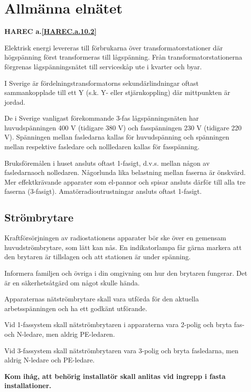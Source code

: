 \section{Allmänna elnätet}
\textbf{
HAREC a.\ref{HAREC.a.10.2}\label{myHAREC.a.10.2}
}
\label{jordning}

Elektrisk energi levereras till förbrukarna över
transformatorstationer där högspänning först transformeras till
lågspänning. Från transformatorstationerna förgrenas lågspänningsnätet
till serviceskåp ute i kvarter och byar.

I Sverige är fördelningstransformatorns sekundärlindningar oftast
sammankopplade till ett Y (s.k. Y- eller stjärnkoppling) där
mittpunkten är jordad.

De i Sverige vanligast förekommande 3-fas lågspänningsnäten har
huvudspänningen 400 V (tidigare 380 V) och fasspänningen 230 V
(tidigare 220 V). Spänningen mellan fasledarna kallas för
huvudspänning och spänningen mellan respektive fasledare och
nollledaren kallas för fasspänning.

Bruksföremålen i huset ansluts oftast 1-fasigt, d.v.s. mellan någon av
fasledarnaoch nolledaren. Någorlunda lika belastning mellan faserna är
önskvärd.  Mer effektkrävande apparater som el-pannor och spisar
ansluts därför till alla tre faserna (3-fasigt).
Amatörradioutrustningar ansluts oftast 1-fasigt.

\subsection{Strömbrytare}

Kraftförsörjningen av radiostationens apparater bör ske över en
gemensam huvudströmbrytare, som lätt kan nås. En indikatorlampa får
gärna markera att den brytaren är tillslagen och att stationen är
under spänning.

Informera familjen och övriga i din omgivning om hur den brytaren
fungerar. Det är en säkerhetsåtgärd om något skulle hända.

Apparaternas nätströmbrytare skall vara utförda för den aktuella
arbetsspänningen och ha ett godkänt utförande.

Vid 1-fassystem skall nätströmbrytaren i apparaterna vara 2-polig och
bryta fas- och N-ledare, men aldrig PE-ledaren.

Vid 3-fassystem skall nätströmbrytaren
vara 3-polig och bryta fasledarna, men aldrig
N-ledare och PE-ledare.

\textbf{Kom ihåg, att behörig installatör skall
  anlitas vid ingrepp i fasta installationer.}

